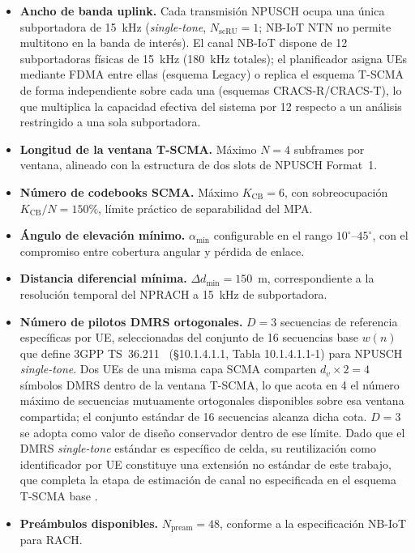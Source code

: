 \begin{itemize}[leftmargin=*, noitemsep]
  \item \textbf{Ancho de banda uplink.} Cada transmisión NPUSCH ocupa una única subportadora de 15~kHz (\textit{single-tone}, $N_{\text{scRU}}=1$; NB-IoT NTN no permite multitono en la banda de interés). El canal NB-IoT dispone de 12 subportadoras físicas de 15~kHz (180~kHz totales); el planificador asigna UEs mediante FDMA entre ellas (esquema Legacy) o replica el esquema T-SCMA de forma independiente sobre cada una (esquemas CRACS-R/CRACS-T), lo que multiplica la capacidad efectiva del sistema por 12 respecto a un análisis restringido a una sola subportadora.
  \item \textbf{Longitud de la ventana T-SCMA.} Máximo $N = 4$ subframes por ventana, alineado con la estructura de dos slots de NPUSCH Format~1.
  \item \textbf{Número de codebooks SCMA.} Máximo $K_{\text{CB}} = 6$, con sobreocupación $K_{\text{CB}}/N = 150\%$, límite práctico de separabilidad del MPA.
  \item \textbf{Ángulo de elevación mínimo.} $\alpha_{\min}$ configurable en el rango $10^\circ$--$45^\circ$, con el compromiso entre cobertura angular y pérdida de enlace.
  \item \textbf{Distancia diferencial mínima.} $\Delta d_{\min} = 150$~m, correspondiente a la resolución temporal del NPRACH a 15~kHz de subportadora.
  \item \textbf{Número de pilotos DMRS ortogonales.} $D=3$ secuencias de referencia específicas por UE, seleccionadas del conjunto de 16 secuencias base $w(n)$ que define 3GPP TS~36.211~\cite{ref39} (§10.1.4.1.1, Tabla 10.1.4.1.1-1) para NPUSCH \textit{single-tone}. Dos UEs de una misma capa SCMA comparten $d_v \times 2 = 4$ símbolos DMRS dentro de la ventana T-SCMA, lo que acota en 4 el número máximo de secuencias mutuamente ortogonales disponibles sobre esa ventana compartida; el conjunto estándar de 16 secuencias alcanza dicha cota. $D=3$ se adopta como valor de diseño conservador dentro de ese límite. Dado que el DMRS \textit{single-tone} estándar es específico de celda, su reutilización como identificador por UE constituye una extensión no estándar de este trabajo, que completa la etapa de estimación de canal no especificada en el esquema T-SCMA base \cite{ref38}.
  \item \textbf{Preámbulos disponibles.} $N_{\text{pream}} = 48$, conforme a la especificación NB-IoT para RACH.
\end{itemize}

